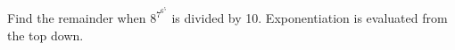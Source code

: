 Find the remainder when $8^{7^{6^5}}$ is divided by 10. Exponentiation is evaluated from the top down.

